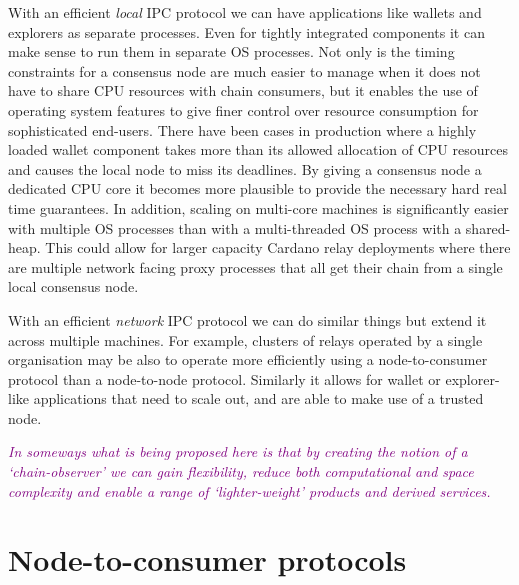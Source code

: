 \documentclass{article}
\newcommand{\njd}[1]{\textcolor{purple}{\emph{#1}}}
\theoremstyle{definition}{
  \newtheorem{lemma}{Lemma}[section] %
  \newtheorem{definition}[lemma]{Definition}
}
\theoremstyle{theorem}{
  \newtheorem{invariant}[lemma]{Invariant}
  \newtheorem{proofobligation}[lemma]{Proof Obligation}
}
\numberwithin{equation}{lemma}
\begin{document}
With an efficient \emph{local} IPC protocol we can have applications like
wallets and explorers as separate processes. Even for tightly integrated
components it can make sense to run them in separate OS processes. Not only is
the timing constraints for a consensus node are much easier to manage when it
does not have to share CPU resources with chain consumers, but it enables the
use of operating system features to give finer control over resource consumption
for sophisticated end-users.
There have been cases in production where a highly
loaded wallet component takes more than its allowed allocation of CPU resources
and causes the local node to miss its deadlines.  By giving a consensus node a
dedicated CPU core it becomes more plausible to provide the necessary hard real
time guarantees. In addition, scaling on multi-core machines is significantly
easier with multiple OS processes than with a multi-threaded OS process with a
shared-heap. This could allow for larger capacity Cardano relay deployments
where there are multiple network facing proxy processes that all get their chain
from a single local consensus node.

With an efficient \emph{network} IPC protocol we can do similar things but
extend it across multiple machines. For example, clusters of relays operated
by a single organisation may be also to operate more efficiently using a
node-to-consumer protocol than a node-to-node protocol. Similarly it allows for
wallet or explorer-like applications that need to scale out, and are able to
make use of a trusted node.

\njd{In someways what is being proposed here is that by creating the notion of
  a `chain-observer' we can gain flexibility, reduce both computational and
  space complexity and enable a range of `lighter-weight' products and derived
  services.
  }

\section{Node-to-consumer protocols}
\end{document}
